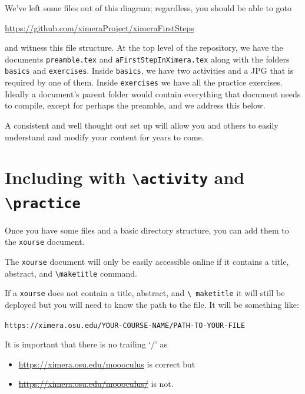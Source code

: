 \documentclass{ximera}
\begin{document}
We've left some files out of this diagram; regardless, you should be able to
goto
\begin{center}
  \url{https://github.com/ximeraProject/ximeraFirstSteps}
\end{center}
and witness this file structure. At the top level of the repository, we have
the documents \verb!preamble.tex! and \verb!aFirstStepInXimera.tex! along with
the folders \verb!basics! and \verb!exercises!. Inside \verb!basics!, we have
two activities and a JPG that is required by one of them. Inside
\verb!exercises!
we have all the practice exercises.
Ideally a document's parent folder would contain everything that document needs
to compile, except for perhaps the preamble, and we address this below.

A consistent and well thought out set up will allow you and others to easily
understand and modify your
content for years to come.

\section{Including with \texttt{\textbackslash activity} and
  \texttt{\textbackslash practice}}

Once you have some files and a basic directory structure, you can add them to
the \verb!xourse! document.

\begin{warning}
  The \verb!xourse! document will only be easily accessible online if it
  contains a title,
  abstract, and {\tt\textbackslash maketitle} command.

  If a \verb!xourse! does not contain a title, abstract, and {\tt\textbackslash
      maketitle} it will still be deployed but you will need to know the path
  to the
  file. It will be something like:
  \begin{center}
    \tt https://ximera.osu.edu/YOUR-COURSE-NAME/PATH-TO-YOUR-FILE
  \end{center}
  It is important that there is no trailing `/' as
  \begin{itemize}
    \item \url{https://ximera.osu.edu/moooculus} is correct but
    \item \sout{\url{https://ximera.osu.edu/moooculus/}} is not.
  \end{itemize}
\end{warning}
\end{document}
